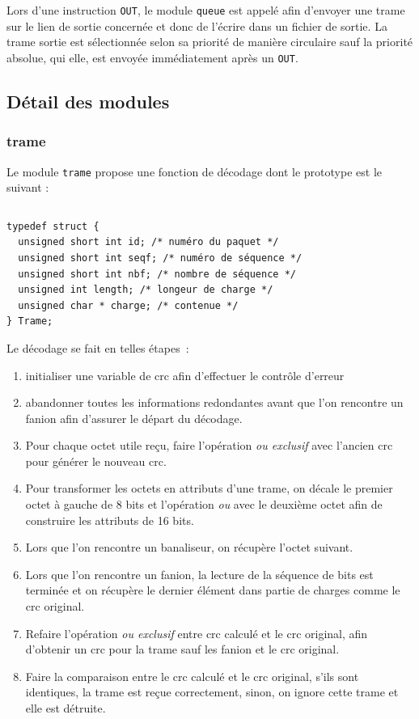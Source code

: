 \documentclass[a4paper,11pt]{article}
\begin{document}
Lors d'une instruction \texttt{OUT}, le module \texttt{queue} est appelé afin d'envoyer une trame sur le lien de sortie concernée et donc de l'écrire dans un fichier de sortie. La trame sortie est sélectionnée selon sa priorité de manière circulaire sauf la priorité absolue, qui elle, est envoyée immédiatement après un \texttt{OUT}.

\subsection{Détail des modules}

\subsubsection{trame}
Le module \texttt{trame} propose une fonction de décodage dont le prototype est le suivant :
\begin{verbatim}

\end{verbatim}
\begin{verbatim}
typedef struct {
  unsigned short int id; /* numéro du paquet */
  unsigned short int seqf; /* numéro de séquence */
  unsigned short int nbf; /* nombre de séquence */
  unsigned int length; /* longeur de charge */
  unsigned char * charge; /* contenue */
} Trame;
\end{verbatim}
Le décodage se fait en telles étapes :
\begin{enumerate}
 \item initialiser une variable de crc afin d'effectuer le contrôle d'erreur
 \item abandonner toutes les informations redondantes avant que l'on rencontre un fanion afin d'assurer le départ du décodage.
 \item Pour chaque octet utile reçu, faire l'opération \textit{ou exclusif} avec l'ancien crc pour générer le nouveau crc.
 \item Pour transformer les octets en attributs d'une trame, on décale le premier octet à gauche de 8 bits et l'opération \textit{ou} avec le deuxième octet afin de construire les attributs de 16 bits.
 \item Lors que l'on rencontre un banaliseur, on récupère l'octet suivant.
 \item Lors que l'on rencontre un fanion, la lecture de la séquence de bits est terminée et on récupère le dernier élément dans partie de charges comme le crc original.
 \item Refaire l'opération \textit{ou exclusif} entre crc calculé et le crc original, afin d'obtenir un crc pour la trame sauf les fanion et le crc original.
 \item Faire la comparaison entre le crc calculé et le crc original, s'ils sont identiques, la trame est reçue correctement, sinon, on ignore cette trame et elle est détruite.
\end{enumerate}
\end{document}
